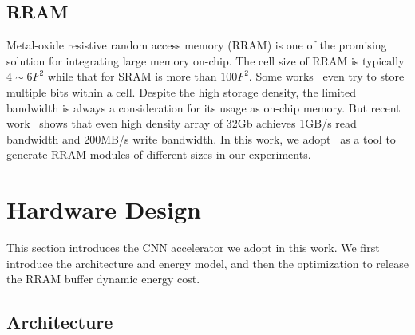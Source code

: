 \documentclass[10pt, conference]{IEEEtran}
\begin{document}
    \subsection{RRAM}
    Metal-oxide resistive random access memory (RRAM) is one of the promising solution for integrating large memory on-chip. The cell size of RRAM is typically $4\sim 6F^2$ while that for SRAM is more than $100F^2$. Some works~\cite{chien2009multi}\cite{chien2011multi} even try to store multiple bits within a cell. Despite the high storage density, the limited bandwidth is always a consideration for its usage as on-chip memory. But recent work~\cite{fackenthal201419} shows that even high density array of 32Gb achieves 1GB/s read bandwidth and 200MB/s write bandwidth. In this work, we adopt~\cite{dong2014nvsim} as a tool to generate RRAM modules of different sizes in our experiments.
    
    \section{Hardware Design}
    This section introduces the CNN accelerator we adopt in this work. We first introduce the architecture and energy model, and then the optimization to release the RRAM buffer dynamic energy cost.
    
    \subsection{Architecture}
    
\end{document}
